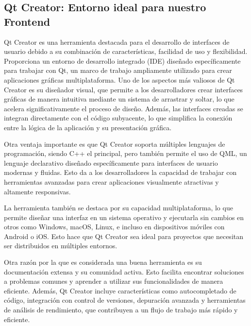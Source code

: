 \documentclass[corference]{IEEEtran}
\begin{document}
\begin{flushleft}
        \section{Qt Creator: Entorno ideal para nuestro Frontend}
        \noindent\hspace*{4em}Qt Creator es una herramienta destacada para el desarrollo de interfaces de usuario debido a su combinación de características, facilidad de uso y flexibilidad. Proporciona un entorno de desarrollo integrado (IDE) diseñado específicamente para trabajar con Qt, un marco de trabajo ampliamente utilizado para crear aplicaciones gráficas multiplataforma. Uno de los aspectos más valiosos de Qt Creator es su diseñador visual, que permite a los desarrolladores crear interfaces gráficas de manera intuitiva mediante un sistema de arrastrar y soltar, lo que acelera significativamente el proceso de diseño. Además, las interfaces creadas se integran directamente con el código subyacente, lo que simplifica la conexión entre la lógica de la aplicación y su presentación gráfica.

        \noindent\hspace*{4em}Otra ventaja importante es que Qt Creator soporta múltiples lenguajes de programación, siendo C++ el principal, pero también permite el uso de QML, un lenguaje declarativo diseñado específicamente para interfaces de usuario modernas y fluidas. Esto da a los desarrolladores la capacidad de trabajar con herramientas avanzadas para crear aplicaciones visualmente atractivas y altamente responsivas.

        \noindent\hspace*{4em}La herramienta también se destaca por su capacidad multiplataforma, lo que permite diseñar una interfaz en un sistema operativo y ejecutarla sin cambios en otros como Windows, macOS, Linux, e incluso en dispositivos móviles con Android o iOS. Esto hace que Qt Creator sea ideal para proyectos que necesitan ser distribuidos en múltiples entornos.

        \noindent\hspace*{4em}Otra razón por la que es considerada una buena herramienta es su documentación extensa y su comunidad activa. Esto facilita encontrar soluciones a problemas comunes y aprender a utilizar sus funcionalidades de manera eficiente. Además, Qt Creator incluye características como autocompletado de código, integración con control de versiones, depuración avanzada y herramientas de análisis de rendimiento, que contribuyen a un flujo de trabajo más rápido y eficiente.


\end{flushleft}
\end{document}
